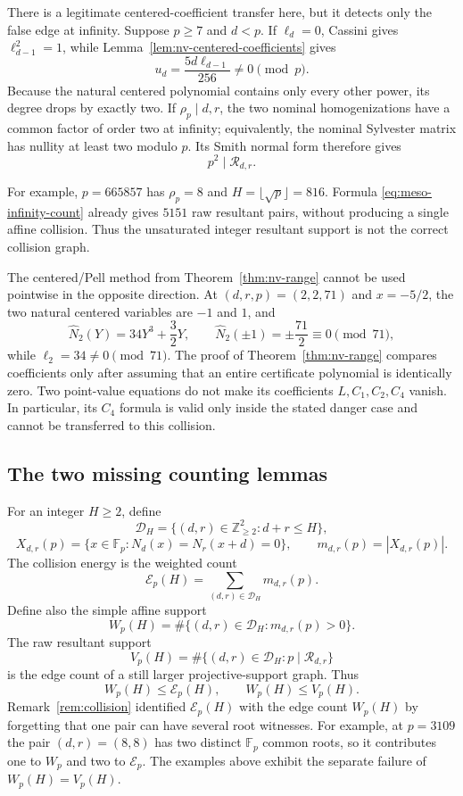 There is a legitimate centered-coefficient transfer here, but it detects
only the false edge at infinity.  Suppose $p\geq7$ and $d<p$.  If
$\ell_d=0$, Cassini gives $\ell_{d-1}^2=1$, while
Lemma~\ref{lem:nv-centered-coefficients} gives
\[
 u_d=\frac{5d\ell_{d-1}}{256}\ne0\pmod p.
\]
Because the natural centered polynomial contains only every other power,
its degree drops by exactly two.  If $\rho_p\mid d,r$, the two nominal
homogenizations have a common factor of order two at infinity; equivalently,
the nominal Sylvester matrix has nullity at least two modulo $p$.  Its Smith
normal form therefore gives
\begin{equation}\label{eq:meso-infinity-square}
 p^2\mid\mathcal R_{d,r}.
\end{equation}

For example, $p=665857$ has $\rho_p=8$ and
$H=\lfloor\sqrt p\rfloor=816$.  Formula
\eqref{eq:meso-infinity-count} already gives $5151$ raw resultant pairs,
without producing a single affine collision.  Thus the unsaturated integer
resultant support is not the correct collision graph.

The centered/Pell method from Theorem~\ref{thm:nv-range} cannot be used
pointwise in the opposite direction.  At $(d,r,p)=(2,2,71)$ and
$x=-5/2$, the two natural centered variables are $-1$ and $1$, and
\[
 \widehat N_2(Y)=34Y^3+\frac32Y,\qquad
 \widehat N_2(\pm1)=\pm\frac{71}{2}\equiv0\pmod {71},
\]
while $\ell_2=34\ne0\pmod {71}$.  The proof of
Theorem~\ref{thm:nv-range} compares coefficients only after assuming
that an entire certificate polynomial is identically zero.  Two point-value
equations do not make its coefficients $L,C_1,C_2,C_4$ vanish.  In
particular, its $C_4$ formula is valid only inside the stated danger case
and cannot be transferred to this collision.

\subsection{The two missing counting lemmas}

For an integer $H\geq2$, define
\[
 \mathscr D_H=\{(d,r)\in\mathbb Z_{\geq2}^2:d+r\leq H\},
\]
\[
 X_{d,r}(p)=\{x\in\mathbb F_p:
 N_d(x)=N_r(x+d)=0\},\qquad m_{d,r}(p)=|X_{d,r}(p)|.
\]
The collision energy is the weighted count
\[
 \mathcal E_p(H)=\sum_{(d,r)\in\mathscr D_H}m_{d,r}(p).
\]
Define also the simple affine support
\[
 W_p(H)=\#\{(d,r)\in\mathscr D_H:m_{d,r}(p)>0\}.
\]
The raw resultant support
\[
 V_p(H)=\#\{(d,r)\in\mathscr D_H:p\mid\mathcal R_{d,r}\}
\]
is the edge count of a still larger projective-support graph.  Thus
\[
 W_p(H)\leq\mathcal E_p(H),\qquad W_p(H)\leq V_p(H).
\]
Remark~\ref{rem:collision} identified $\mathcal E_p(H)$ with the edge
count $W_p(H)$ by forgetting that one pair can have several root witnesses.
For example, at $p=3109$ the pair $(d,r)=(8,8)$ has two distinct
$\mathbb F_p$ common roots, so it contributes one to $W_p$ and two to
$\mathcal E_p$.  The examples above exhibit the separate failure of
$W_p(H)=V_p(H)$.

